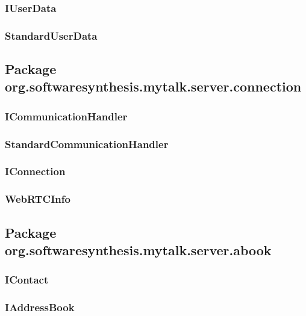 \subsubsection{IUserData}\label{sec:iuserdata}

\subsubsection{StandardUserData}\label{sec:standarduserdata}

\subsection{Package org.softwaresynthesis.mytalk.server.connection}\label{sec:connection}

\subsubsection{ICommunicationHandler}\label{sec:icommunicationhandler}

\subsubsection{StandardCommunicationHandler}\label{sec:standardcommunicationhandler}

\subsubsection{IConnection}\label{sec:iconnection}

\subsubsection{WebRTCInfo}\label{sec:webrtcinfo}

\subsection{Package org.softwaresynthesis.mytalk.server.abook}\label{sec:abook}

\subsubsection{IContact}\label{sec:icontact}

\subsubsection{IAddressBook}\label{sec:iaddressbook}

